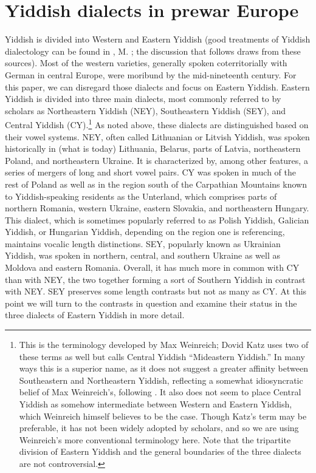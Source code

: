 \documentclass[output=paper,colorlinks,citecolor=brown]{langscibook}
\begin{document}
\section{Yiddish dialects in prewar Europe}
\label{sec:nove:2}

Yiddish is divided into Western and Eastern Yiddish (good treatments of Yiddish dialectology can be found in \citealt{Birnbaum1923, Birnbaum1979,Herzog1965}, M. \citealt{Weinreich1973,Jacobs2005,Beider2015}; the discussion that follows draws from these sources). Most of the western varieties, generally spoken coterritorially with German in central Europe, were moribund by the mid-nineteenth century. For this paper, we can disregard those dialects and focus on Eastern Yiddish.
\newpage
Eastern Yiddish is divided into three main dialects, most commonly referred to by scholars as Northeastern Yiddish (NEY), Southeastern Yiddish (SEY), and Central Yiddish (CY).{\footnote{This is the terminology developed by Max Weinreich; Dovid Katz uses two of these terms as well but calls Central Yiddish ``Mideastern Yiddish.'' In many ways this is a superior name, as it does not suggest a greater affinity between Southeastern and Northeastern Yiddish, reflecting a somewhat idiosyncratic belief of Max Weinreich's, following \citet{Prilutski1920}. It also does not seem to place Central Yiddish as somehow intermediate between Western and Eastern Yiddish, which Weinreich himself believes to be the case. Though Katz's term may be preferable, it has not been widely adopted by scholars, and so we are using Weinreich's more conventional terminology here. Note that the tripartite division of Eastern Yiddish and the general boundaries of the three dialects are not controversial.}} As noted above, these dialects are distinguished based on their vowel systems. NEY, often called Lithuanian or Litvish Yiddish, was spoken historically in (what is today) Lithuania, Belarus, parts of Latvia, northeastern Poland, and northeastern Ukraine. It is characterized by, among other features, a series of mergers of long and short vowel pairs. CY was spoken in much of the rest of Poland as well as in the region south of the Carpathian Mountains known to Yiddish\hyp speaking residents as the Unterland, which comprises parts of northern Romania, western Ukraine, eastern Slovakia, and northeastern Hungary. This dialect, which is sometimes popularly referred to as Polish Yiddish, Galician Yiddish, or Hungarian Yiddish, depending on the region one is referencing, maintains vocalic length distinctions. SEY, popularly known as Ukrainian Yiddish, was spoken in northern, central, and southern Ukraine as well as Moldova and eastern Romania. Overall, it has much more in common with CY than with NEY, the two together forming a sort of Southern Yiddish in contrast with NEY. SEY preserves some length contrasts but not as many as CY. At this point we will turn to the contrasts in question and examine their status in the three dialects of Eastern Yiddish in more detail.
\end{document}
